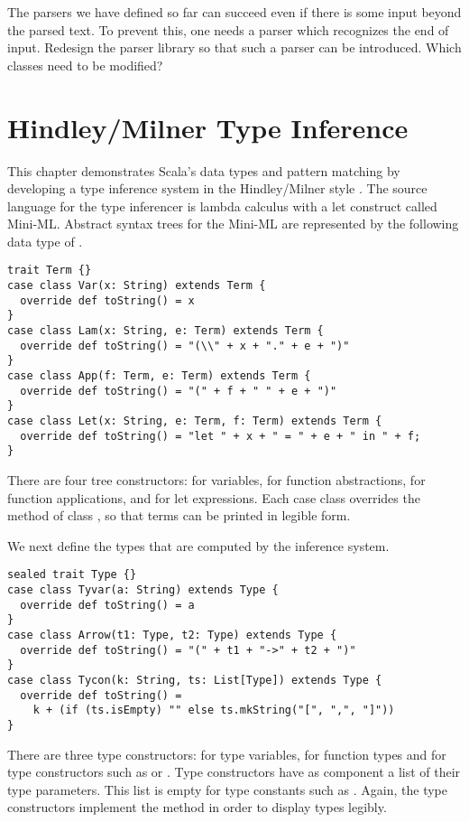 {\begin{exercise}\label{exercise:end-marker} The parsers we have defined so
far can succeed even if there is some input beyond the parsed text. To
prevent this, one needs a parser which recognizes the end of input.
Redesign the parser library so that such a parser can be introduced.
Which classes need to be modified?
\end{exercise}

\chapter{\label{sec:hm}Hindley/Milner Type Inference}

This chapter demonstrates Scala's data types and pattern matching by
developing a type inference system in the Hindley/Milner style
\cite{milner:polymorphism}. The source language for the type inferencer is
lambda calculus with a let construct called Mini-ML. Abstract syntax
trees for the Mini-ML are represented by the following data type of
.
\begin{lstlisting}
trait Term {}
case class Var(x: String) extends Term {
  override def toString() = x
}
case class Lam(x: String, e: Term) extends Term {
  override def toString() = "(\\" + x + "." + e + ")"
}
case class App(f: Term, e: Term) extends Term {
  override def toString() = "(" + f + " " + e + ")"
}
case class Let(x: String, e: Term, f: Term) extends Term {
  override def toString() = "let " + x + " = " + e + " in " + f;
}
\end{lstlisting}
There are four tree constructors:  for variables, 
for function abstractions,  for function applications, and
 for let expressions. Each case class overrides the
 method of class , so that terms can be
printed in legible form.

We next define the types that are
computed by the inference system.
\begin{lstlisting}
sealed trait Type {}
case class Tyvar(a: String) extends Type {
  override def toString() = a
}
case class Arrow(t1: Type, t2: Type) extends Type {
  override def toString() = "(" + t1 + "->" + t2 + ")"
}
case class Tycon(k: String, ts: List[Type]) extends Type {
  override def toString() = 
    k + (if (ts.isEmpty) "" else ts.mkString("[", ",", "]"))
}
\end{lstlisting}
There are three type constructors:  for type variables,
 for function types and  for type constructors
such as  or . Type constructors have as
component a list of their type parameters. This list is empty for type
constants such as . Again, the type constructors
implement the  method in order to display types legibly.

}
